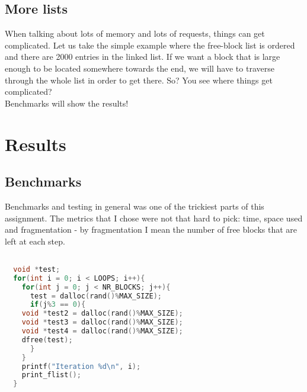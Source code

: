 \documentclass[a4paper,10pt]{article}
\begin{document}
\subsection*{More lists}
When talking about lots of memory and lots of requests, things can get complicated. Let us take the simple example where the free-block list is ordered and there are 2000 entries in the linked list. If we want a block that is large enough to be located somewhere towards the end, we will have to traverse through the whole list in order to get there. So? You see where things get complicated?\\
Benchmarks will show the results!
\vspace{5mm}
\section*{Results}
\subsection*{Benchmarks}
Benchmarks and testing in general was one of the trickiest parts of this assignment. The metrics that I chose were not that hard to pick: time, space used and fragmentation - by fragmentation I mean the number of free blocks that are left at each step.

\vspace{5mm}
\begin{lstlisting}[language=C]

  void *test;
  for(int i = 0; i < LOOPS; i++){
    for(int j = 0; j < NR_BLOCKS; j++){
      test = dalloc(rand()%MAX_SIZE);
      if(j%3 == 0){
	void *test2 = dalloc(rand()%MAX_SIZE);
	void *test3 = dalloc(rand()%MAX_SIZE);
	void *test4 = dalloc(rand()%MAX_SIZE);
	dfree(test);
      }
    }
    printf("Iteration %d\n", i);
    print_flist();
  }
\end{lstlisting}
\end{document}
